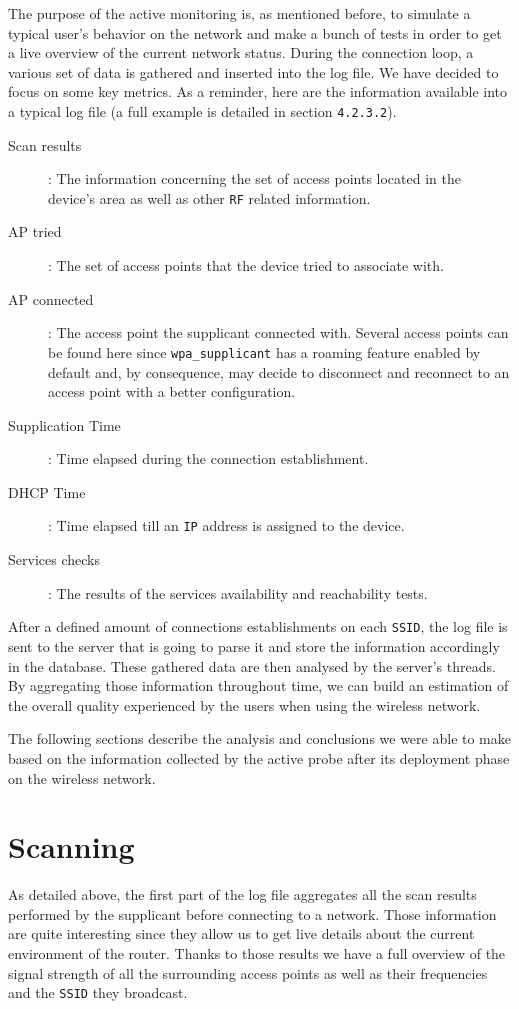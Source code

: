 The purpose of the active monitoring is, as mentioned before, to simulate a typical user's behavior on the network and make a bunch of tests in order to get a live overview of the current network status. During the connection loop, a various set of data is gathered and inserted into the log file. We have decided to focus on some key metrics. As a reminder, here are the information available into a typical log file (a full example is detailed in section \texttt{4.2.3.2}).

\begin{description}
	\item[Scan results]: The information concerning the set of access points located in the device's area as well as other \texttt{RF} related information.
	\item[AP tried]: The set of access points that the device tried to associate with.
	\item[AP connected]: The access point the supplicant connected with. Several access points can be found here since \texttt{wpa\_supplicant} has a roaming feature enabled by default and, by consequence, may decide to disconnect and reconnect to an access point with a better configuration.
	\item[Supplication Time]: Time elapsed during the connection establishment.
	\item [DHCP Time]: Time elapsed till an \texttt{IP} address is assigned to the device.
	\item [Services checks]: The results of the services availability and reachability tests.
\end{description}

After a defined amount of connections establishments on each \texttt{SSID}, the log file is sent to the server that is going to parse it and store the information accordingly in the database. These gathered data are then analysed by the server's threads. By aggregating those information throughout time, we can build an estimation of the overall quality experienced by the users when using the wireless network.

The following sections describe the analysis and conclusions we were able to make based on the information collected by the active probe after its deployment phase on the wireless network.


\section{Scanning}
As detailed above, the first part of the log file aggregates all the scan results performed by the supplicant before connecting to a network. Those information are quite interesting since they allow us to get live details about the current environment of the router. Thanks to those results we have a full overview of the signal strength of all the surrounding access points as well as their frequencies and the \texttt{SSID} they broadcast. 


